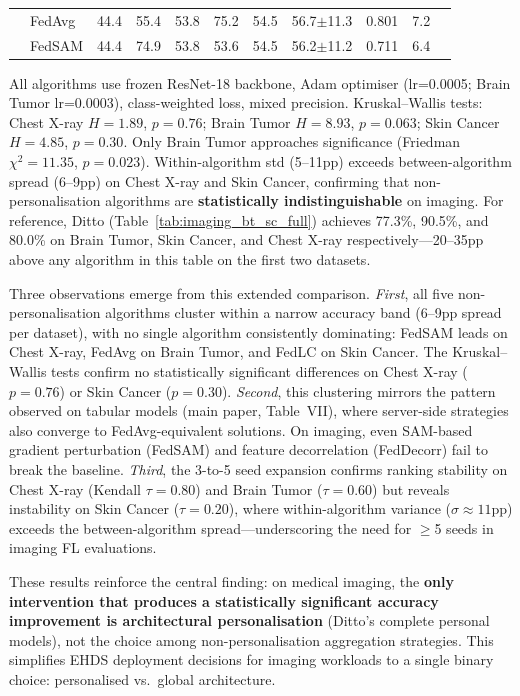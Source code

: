 \documentclass[conference]{IEEEtran}
\begin{document}
\begin{table}[htbp]
\begin{tabular}{llccccccccc}
 & FedAvg & 44.4 & 55.4 & 53.8 & 75.2 & 54.5 & 56.7$\pm$11.3 & 0.801 & 7.2 \\
 & FedSAM & 44.4 & 74.9 & 53.8 & 53.6 & 54.5 & 56.2$\pm$11.2 & 0.711 & 6.4 \\
\bottomrule
\end{tabular}
\par{\footnotesize All algorithms use frozen ResNet-18 backbone, Adam optimiser (lr=0.0005; Brain Tumor lr=0.0003), class-weighted loss, mixed precision. Kruskal--Wallis tests: Chest X-ray $H{=}1.89$, $p{=}0.76$; Brain Tumor $H{=}8.93$, $p{=}0.063$; Skin Cancer $H{=}4.85$, $p{=}0.30$. Only Brain Tumor approaches significance (Friedman $\chi^2{=}11.35$, $p{=}0.023$). Within-algorithm std (5--11pp) exceeds between-algorithm spread (6--9pp) on Chest X-ray and Skin Cancer, confirming that non-personalisation algorithms are \textbf{statistically indistinguishable} on imaging. For reference, Ditto (Table~\ref{tab:imaging_bt_sc_full}) achieves 77.3\%, 90.5\%, and 80.0\% on Brain Tumor, Skin Cancer, and Chest X-ray respectively---20--35pp above any algorithm in this table on the first two datasets.}
\end{table}

Three observations emerge from this extended comparison. \textit{First}, all five non-personalisation algorithms cluster within a narrow accuracy band (6--9pp spread per dataset), with no single algorithm consistently dominating: FedSAM leads on Chest X-ray, FedAvg on Brain Tumor, and FedLC on Skin Cancer. The Kruskal--Wallis tests confirm no statistically significant differences on Chest X-ray ($p{=}0.76$) or Skin Cancer ($p{=}0.30$). \textit{Second}, this clustering mirrors the pattern observed on tabular models (main paper, Table~VII), where server-side strategies also converge to FedAvg-equivalent solutions. On imaging, even SAM-based gradient perturbation (FedSAM) and feature decorrelation (FedDecorr) fail to break the baseline. \textit{Third}, the 3-to-5 seed expansion confirms ranking stability on Chest X-ray (Kendall $\tau{=}0.80$) and Brain Tumor ($\tau{=}0.60$) but reveals instability on Skin Cancer ($\tau{=}0.20$), where within-algorithm variance ($\sigma{\approx}11$pp) exceeds the between-algorithm spread---underscoring the need for $\geq$5 seeds in imaging FL evaluations.

These results reinforce the central finding: on medical imaging, the \textbf{only intervention that produces a statistically significant accuracy improvement is architectural personalisation} (Ditto's complete personal models), not the choice among non-personalisation aggregation strategies. This simplifies EHDS deployment decisions for imaging workloads to a single binary choice: personalised vs.\ global architecture.
\end{document}
